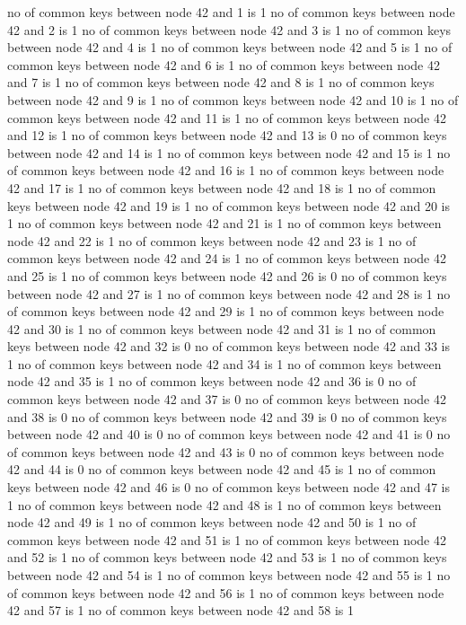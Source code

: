 no of common keys between node 42 and 1 is 1
no of common keys between node 42 and 2 is 1
no of common keys between node 42 and 3 is 1
no of common keys between node 42 and 4 is 1
no of common keys between node 42 and 5 is 1
no of common keys between node 42 and 6 is 1
no of common keys between node 42 and 7 is 1
no of common keys between node 42 and 8 is 1
no of common keys between node 42 and 9 is 1
no of common keys between node 42 and 10 is 1
no of common keys between node 42 and 11 is 1
no of common keys between node 42 and 12 is 1
no of common keys between node 42 and 13 is 0
no of common keys between node 42 and 14 is 1
no of common keys between node 42 and 15 is 1
no of common keys between node 42 and 16 is 1
no of common keys between node 42 and 17 is 1
no of common keys between node 42 and 18 is 1
no of common keys between node 42 and 19 is 1
no of common keys between node 42 and 20 is 1
no of common keys between node 42 and 21 is 1
no of common keys between node 42 and 22 is 1
no of common keys between node 42 and 23 is 1
no of common keys between node 42 and 24 is 1
no of common keys between node 42 and 25 is 1
no of common keys between node 42 and 26 is 0
no of common keys between node 42 and 27 is 1
no of common keys between node 42 and 28 is 1
no of common keys between node 42 and 29 is 1
no of common keys between node 42 and 30 is 1
no of common keys between node 42 and 31 is 1
no of common keys between node 42 and 32 is 0
no of common keys between node 42 and 33 is 1
no of common keys between node 42 and 34 is 1
no of common keys between node 42 and 35 is 1
no of common keys between node 42 and 36 is 0
no of common keys between node 42 and 37 is 0
no of common keys between node 42 and 38 is 0
no of common keys between node 42 and 39 is 0
no of common keys between node 42 and 40 is 0
no of common keys between node 42 and 41 is 0
no of common keys between node 42 and 43 is 0
no of common keys between node 42 and 44 is 0
no of common keys between node 42 and 45 is 1
no of common keys between node 42 and 46 is 0
no of common keys between node 42 and 47 is 1
no of common keys between node 42 and 48 is 1
no of common keys between node 42 and 49 is 1
no of common keys between node 42 and 50 is 1
no of common keys between node 42 and 51 is 1
no of common keys between node 42 and 52 is 1
no of common keys between node 42 and 53 is 1
no of common keys between node 42 and 54 is 1
no of common keys between node 42 and 55 is 1
no of common keys between node 42 and 56 is 1
no of common keys between node 42 and 57 is 1
no of common keys between node 42 and 58 is 1
